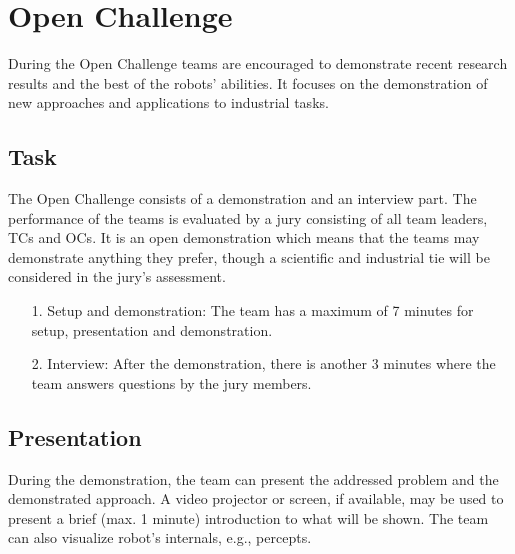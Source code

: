 

\newpage
\section{Open Challenge}
During the Open Challenge teams are encouraged to demonstrate recent research results and the best of the robots’ abilities. It focuses on the demonstration of new approaches and applications to industrial tasks.

\subsection{Task}

The Open Challenge consists of a demonstration and an interview part. The performance of the teams is evaluated by a jury consisting of all team leaders, TCs and OCs. It is an open demonstration which means that the teams may demonstrate anything they prefer, though a scientific and industrial tie will be considered in the jury's assessment. 
\begin{itemize}

\item[1.] Setup and demonstration: The team has a maximum of 7 minutes for setup, presentation and demonstration.
\item[2.] Interview: After the demonstration, there is another 3 minutes where the team answers questions by the jury members.
\end{itemize}

\subsection{Presentation}
During the demonstration, the team can present the addressed problem and the demonstrated approach.
A video projector or screen, if available, may be used to present a brief (max. 1 minute) introduction to what will be shown. The team can also visualize robot’s internals, e.g., percepts.

